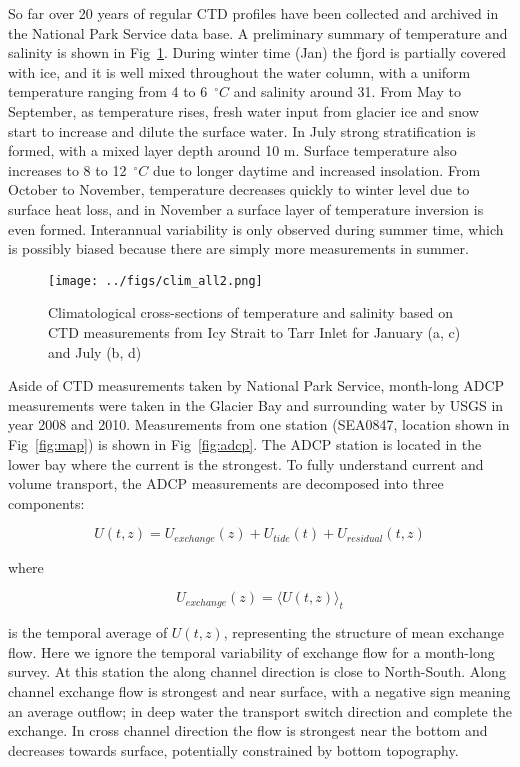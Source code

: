 \documentclass{article}
\begin{document}
So far over 20 years of regular CTD profiles have been collected and archived in the National Park Service data base. A preliminary summary of temperature and salinity is shown in Fig~\ref{fig:ts_clim}. During winter time (Jan) the fjord is partially covered with ice, and it is well mixed throughout the water column, with a uniform temperature ranging from 4 to 6~$^{\circ}C$ and salinity around 31. From May to September, as temperature rises, fresh water input from glacier ice and snow start to increase and dilute the surface water. In July strong stratification is formed, with a mixed layer depth around 10 m. Surface temperature also increases to 8 to 12~$^{\circ}C$ due to longer daytime and increased insolation. From October to November, temperature decreases quickly to winter level due to surface heat loss, and in November a surface layer of temperature inversion is even formed. Interannual variability is only observed during summer time, which is possibly biased because there are simply more measurements in summer.\\

\begin{figure}
\centerline{\texttt{[image: ../figs/clim\_all2.png]}}
\caption{Climatological cross-sections of temperature and salinity based on CTD measurements from Icy Strait to Tarr Inlet for January (a, c) and July (b, d)}
\label{fig:ts_clim}
\end{figure}

Aside of CTD measurements taken by National Park Service, month-long ADCP measurements were taken in the Glacier Bay and surrounding water by USGS in year 2008 and 2010. Measurements from one station (SEA0847, location shown in Fig~\ref{fig:map}) is shown in Fig~\ref{fig:adcp}. The ADCP station is located in the lower bay where the current is the strongest. To fully understand current and volume transport, the ADCP measurements are decomposed into three components:

\begin{equation}
U(t, z) = U_{exchange}(z) + U_{tide}(t) + U_{residual}(t, z)
\label{eq:u}
\end{equation}

where

\begin{equation}
U_{exchange}(z) = \langle U(t, z) \rangle_t
\label{eq:uex}
\end{equation}

is the temporal average of $U(t, z)$, representing the structure of mean exchange flow. Here we ignore the temporal variability of exchange flow for a month-long survey. At this station the along channel direction is close to North-South. Along channel exchange flow is strongest and near surface, with a negative sign meaning an average outflow; in deep water the transport switch direction and complete the exchange. In cross channel direction the flow is strongest near the bottom and decreases towards surface, potentially constrained by bottom topography.\\
\end{document}
